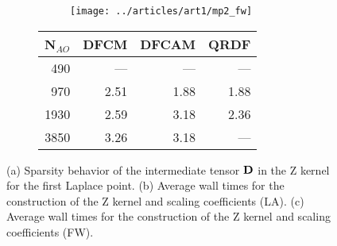\begin{figure}[htp]
\begin{subfigure}{\textwidth}
\begin{subfigure}{0.45\textwidth}
\centering
\texttt{[image: ../articles/art1/mp2\_fw]}
\end{subfigure}
\hfill
\begin{subtable}{0.4\textwidth}
\centering
\begin{tabular}{rrrr}
\hline
N$_{AO}$ & DFCM & DFCAM & QRDF \\
\hline 
490 & --- & --- & --- \\ 
970 & 2.51 & 1.88 & 1.88 \\ 
1930 & 2.59 & 3.18 & 2.36 \\ 
3850 & 3.26 & 3.18 & --- \\ 
 \hline
\end{tabular}
\end{subtable}
\caption{}
\label{fig:GS_ZSCALE_FW}
\end{subfigure}

\caption[Sparsity behavior of the intermediate tensors in the Z kernel.]{(a) Sparsity behavior of the intermediate tensor $\mathbf{D}$ in the Z kernel for the first Laplace point. (b) Average wall times for the construction of the Z kernel and scaling coefficients (LA). (c) Average wall times for the construction of the Z kernel and scaling coefficients (FW).}

\end{figure}